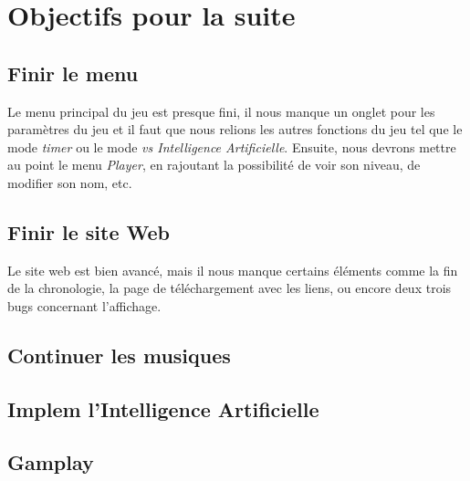 \documentclass[12pt,a4paper]{article}
\newcommand{\AI}{Intelligence Artificielle}
\begin{document}
\section{Objectifs pour la suite}
\subsection{Finir le menu}
Le menu principal du jeu est presque fini, il nous manque un onglet 
pour les paramètres du jeu et il faut que nous relions les autres
fonctions du jeu tel que le mode \textit{timer} ou le mode \textit{vs \AI}.
Ensuite, nous devrons mettre au point le menu \textit{Player}, en rajoutant 
la possibilité de voir son niveau, de modifier son nom, etc.

\subsection{Finir le site Web}
Le site web est bien avancé, mais il nous manque certains éléments 
comme la fin de la chronologie, la page de téléchargement avec les liens,
ou encore deux trois bugs concernant l'affichage.

\subsection{Continuer les musiques}

\subsection{Implem l'\AI}
\subsection{Gamplay}
\end{document}
